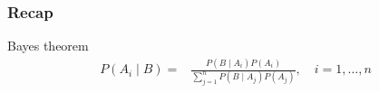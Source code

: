 \documentclass[slidestop,compress,mathserif]{beamer}
\begin{document}
%
%
%



\begin{frame}\frametitle{Recap}

Bayes theorem
\begin{align*}
P(A_i \mid B) = & \frac{P(B \mid A_i)P(A_i)}{\sum\limits_{j = 1}^n P(B \mid A_j)P(A_j)},
\quad i = 1, \ldots, n
\end{align*}
%
%


\end{frame}


\end{document}
